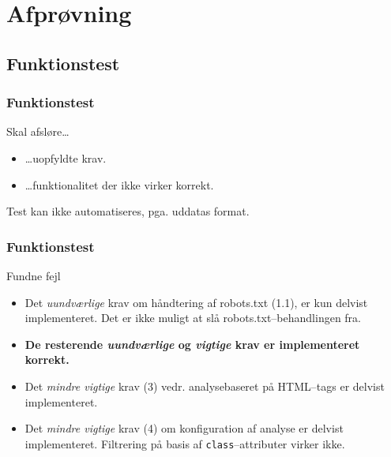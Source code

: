 \documentclass{beamer}
\begin{document}
\section{Afprøvning}
\subsection{Funktionstest}
\begin{frame}
  \frametitle{Funktionstest}

  \begin{block}{Skal afsløre\dots}
    \begin{itemize}
    \item \dots uopfyldte krav.
    \item \dots funktionalitet der ikke virker korrekt.
    \end{itemize}
  \end{block}

  Test kan ikke automatiseres, pga. uddatas format.

\end{frame}

\begin{frame}
  \frametitle{Funktionstest}
  Fundne fejl
    \begin{itemize}
    \item Det \textit{uundværlige} krav om håndtering af robots.txt
      (1.1), er kun delvist implementeret. Det er ikke muligt at slå
      robots.txt--behandlingen fra.

    \item \textbf{De resterende \textit{uundværlige} og \textit{vigtige}
      krav er implementeret korrekt.}

    \item Det \textit{mindre vigtige} krav (3) vedr. analysebaseret på
      HTML--tags er delvist implementeret.

    \item Det \textit{mindre vigtige} krav (4) om konfiguration af
      analyse er delvist implementeret. Filtrering på basis af
      \texttt{class}--attributer virker ikke.
    \end{itemize}
\end{frame}
\end{document}
